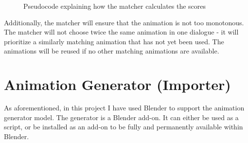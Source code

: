 \begin{figure}[!ht]
\centerline{}
\caption{Pseudocode explaining how the matcher calculates the scores}\label{fig:matcher}
\end{figure}

Additionally, the matcher will ensure that the animation is not too monotonous. The matcher will not choose twice the same animation in one dialogue - it  will prioritize a similarly matching animation that has not yet been used. The animations will be reused if no other matching animations are available.


\section{Animation Generator (Importer)}
\label{sec:generatordesign}

As aforementioned, in this project I have used Blender to support the animation generator model. The generator is a Blender add-on.  It can either be used as a script, or be installed as an add-on to be fully and permanently available within Blender.

